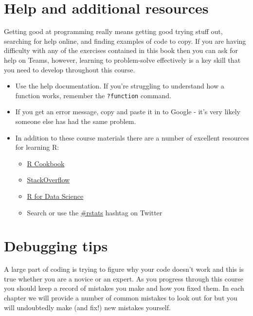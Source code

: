 \documentclass[
  oneside]{book}
\providecommand{\tightlist}{%
  \setlength{\itemsep}{0pt}\setlength{\parskip}{0pt}}
\begin{document}
\hypertarget{help-and-additional-resources}{%
\section{Help and additional resources}\label{help-and-additional-resources}}

Getting good at programming really means getting good trying stuff out, searching for help online, and finding examples of code to copy. If you are having difficulty with any of the exercises contained in this book then you can ask for help on Teams, however, learning to problem-solve effectively is a key skill that you need to develop throughout this course.

\begin{itemize}
\tightlist
\item
  Use the help documentation. If you're struggling to understand how a function works, remember the \texttt{?function} command.
\item
  If you get an error message, copy and paste it in to Google - it's very likely someone else has had the same problem.
\item
  In addition to these course materials there are a number of excellent resources for learning R:

  \begin{itemize}
  \tightlist
  \item
    \href{http://www.cookbook-r.com/}{R Cookbook}
  \item
    \href{https://stackoverflow.com/}{StackOverflow}
  \item
    \href{https://r4ds.had.co.nz/}{R for Data Science}
  \item
    Search or use the \href{https://twitter.com/search?f=tweets\&q=\%23rstats\&src=typd}{\#rstats} hashtag on Twitter
  \end{itemize}
\end{itemize}

\hypertarget{debugging-tips}{%
\section{Debugging tips}\label{debugging-tips}}

A large part of coding is trying to figure why your code doesn't work and this is true whether you are a novice or an expert. As you progress through this course you should keep a record of mistakes you make and how you fixed them. In each chapter we will provide a number of common mistakes to look out for but you will undoubtedly make (and fix!) new mistakes yourself.
\end{document}

